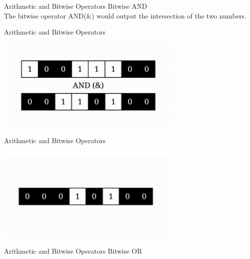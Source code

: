 \documentclass{beamer}
\begin{document}
    \begin{frame}{Arithmetic and Bitwise Operators}
        \color{blue} \Large Bitwise AND \\
        \color{black} \normalsize \vskip 10pt
        The bitwise operator AND($\&$) would output the intersection of the two numbers.\\
    \end{frame}
    
    \begin{frame}{Arithmetic and Bitwise Operators}
        \begin{center}
            \includegraphics[scale = 0.8]{AND Before.png}
        \end{center}
    \end{frame}
    
    \begin{frame}{Arithmetic and Bitwise Operators}
        \begin{center}
            \includegraphics[scale = 0.8]{AND After.png}
        \end{center}
    \end{frame}
    
    \begin{frame}{Arithmetic and Bitwise Operators}
        \color{blue} \Large Bitwise  OR\\
        \color{black} \normalsize \vskip 10pt
        
    \end{frame}
    
\end{document}
